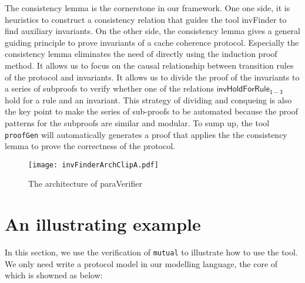 \documentclass{llncs}
\begin{document}
The consistency lemma is the cornerstone in our framework.  One one
side, it is heuristics to construct a consistency relation that
guides the tool {\sf invFinder} to find auxiliary invariants. On the
other side, the consistency lemma gives a general guiding principle
to prove invariants of a cache coherence protocol. Especially the
consistency lemma eliminates the need of directly using the
induction proof method. It allows us to focus on  the causal
relationship between transition rules of the protocol and
invariants. It allows us to divide the proof of the invariants to a
series of subproofs to verify whether one of the relations
$\mathsf{invHoldForRule_{1-3}}$ hold
  for  a rule  and an invariant. This strategy of dividing and
  conqueing is also the key point to make the series of sub-proofs
  to be automated because the proof patterns for the  subproofs  are similar
  and modular. To sump up, the tool \texttt{proofGen} will
  automatically generates a proof that applies the the consistency
  lemma to prove the correctness of the protocol.


 \begin{figure}[!ht]
 \vspace{-0.8cm}
\texttt{[image: invFinderArchClipA.pdf]}
 \caption{The architecture of {\sf paraVerifier}}
\label{fig:arch}
\end{figure}
 \vspace{1cm}


\section{An illustrating example}
In this section, we use the verification of {\tt mutual}   to illustrate how to use the tool. 
We only need write a protocol model in our modelling language, the core of which is showned as below:
\end{document}
